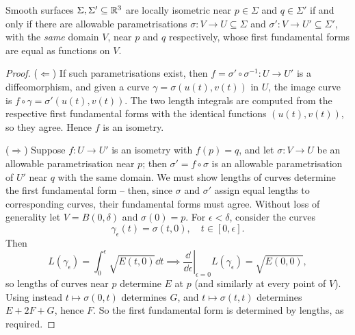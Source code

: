 \documentclass[a4paper]{scrartcl}
\begin{document}
\begin{lemma}\label{lem:fffisometry}
    Smooth surfaces $\Sigma, \Sigma' \subseteq \mathbb{R}^3$ are locally isometric near $p \in \Sigma$ and $q \in \Sigma'$ if and only if there are allowable parametrisations $\sigma: V \rightarrow U \subseteq \Sigma$ and $\sigma': V \rightarrow U' \subseteq \Sigma'$, with the \emph{same} domain $V$, near $p$ and $q$ respectively, whose first fundamental forms are equal as functions on $V$.
\end{lemma}
\begin{proof}
    ($\Leftarrow$) If such parametrisations exist, then $f = \sigma' \circ \sigma^{-1}: U \rightarrow U'$ is a diffeomorphism, and given a curve $\gamma = \sigma(u(t), v(t))$ in $U$, the image curve is $f \circ \gamma = \sigma'(u(t), v(t))$. The two length integrals are computed from the respective first fundamental forms with the identical functions $(u(t), v(t))$, so they agree. Hence $f$ is an isometry.

    ($\Rightarrow$) Suppose $f: U \rightarrow U'$ is an isometry with $f(p) = q$, and let $\sigma: V \rightarrow U$ be an allowable parametrisation near $p$; then $\sigma' = f \circ \sigma$ is an allowable parametrisation of $U'$ near $q$ with the same domain. We must show lengths of curves determine the first fundamental form -- then, since $\sigma$ and $\sigma'$ assign equal lengths to corresponding curves, their fundamental forms must agree. Without loss of generality let $V = B(0, \delta)$ and $\sigma(0) = p$. For $\epsilon < \delta$, consider the curves
    $$
    \gamma_\epsilon(t) = \sigma(t, 0), \quad t \in [0, \epsilon].
    $$
    Then
    $$
    L(\gamma_\epsilon) = \int_0^\epsilon \sqrt{E(t, 0)} \dd t \implies \left.\frac{\dd}{\dd \epsilon}\right|_{\epsilon = 0} L(\gamma_\epsilon) = \sqrt{E(0,0)},
    $$
    so lengths of curves near $p$ determine $E$ at $p$ (and similarly at every point of $V$). Using instead $t \mapsto \sigma(0, t)$ determines $G$, and $t \mapsto \sigma(t, t)$ determines $E + 2F + G$, hence $F$. So the first fundamental form is determined by lengths, as required.
\end{proof}
\end{document}
